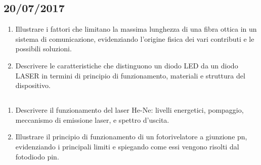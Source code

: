 \documentclass{article}
\begin{document}
\subsection{20/07/2017}
\begin{enumerate}
  \item Illustrare i fattori che limitano la massima lunghezza di una fibra ottica in un sistema di comunicazione,
        evidenziando l’origine fisica dei vari contributi e le possibili soluzioni.
  \item Descrivere le caratteristiche che distinguono un diodo LED da un diodo LASER in termini di principio di
        funzionamento, materiali e struttura del dispositivo.
\end{enumerate}

\subsection{}
\begin{enumerate}
  \item Descrivere il funzionamento del laser He-Ne: livelli energetici, pompaggio, meccanismo di emissione laser, e
        spettro d’uscita.
  \item Illustrare il principio di funzionamento di un fotorivelatore a giunzione pn, evidenziando i principali limiti e
        spiegando come essi vengono risolti dal fotodiodo pin.
\end{enumerate}

\iffalse
  \subsection{}
  \begin{enumerate}
    \item
    \item
  \end{enumerate}
\fi
\end{document}
